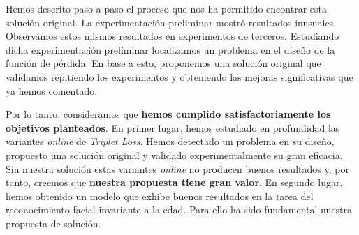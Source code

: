 Hemos descrito paso a paso el proceso que nos ha permitido encontrar esta solución original. La experimentación preliminar mostró resultados inusuales. Observamos estos mismos resultados en experimentos de terceros. Estudiando dicha experimentación preliminar localizamos un problema en el diseño de la función de pérdida. En base a esto, proponemos una solución original que validamos repitiendo los experimentos y obteniendo las mejoras significativas que ya hemos comentado.

Por lo tanto, consideramos que \textbf{hemos cumplido satisfactoriamente los objetivos planteados}. En primer lugar, hemos estudiado en profundidad las variantes \textit{online} de \textit{Triplet Loss}. Hemos detectado un problema en su diseño, propuesto una solución original y validado experimentalmente su gran eficacia. Sin nuestra solución estas variantes \textit{online} no producen buenos resultados y, por tanto, creemos que \textbf{nuestra propuesta tiene gran valor}. En segundo lugar, hemos obtenido un modelo que exhibe buenos resultados en la tarea del reconocimiento facial invariante a la edad. Para ello ha sido fundamental nuestra propuesta de solución.

\endinput
